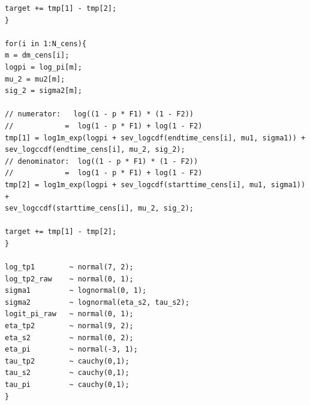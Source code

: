 \documentclass[12pt]{article}
\begin{document}
{\begin{verbatim}
target += tmp[1] - tmp[2];
}

for(i in 1:N_cens){
m = dm_cens[i];
logpi = log_pi[m];
mu_2 = mu2[m];
sig_2 = sigma2[m];

// numerator:   log((1 - p * F1) * (1 - F2))
//            =  log(1 - p * F1) + log(1 - F2)
tmp[1] = log1m_exp(logpi + sev_logcdf(endtime_cens[i], mu1, sigma1)) +
sev_logccdf(endtime_cens[i], mu_2, sig_2);
// denominator:  log((1 - p * F1) * (1 - F2))
//            =  log(1 - p * F1) + log(1 - F2)
tmp[2] = log1m_exp(logpi + sev_logcdf(starttime_cens[i], mu1, sigma1)) +
sev_logccdf(starttime_cens[i], mu_2, sig_2);

target += tmp[1] - tmp[2];
}

log_tp1        ~ normal(7, 2);
log_tp2_raw    ~ normal(0, 1);
sigma1         ~ lognormal(0, 1);
sigma2         ~ lognormal(eta_s2, tau_s2);
logit_pi_raw   ~ normal(0, 1);
eta_tp2        ~ normal(9, 2);
eta_s2         ~ normal(0, 2);
eta_pi         ~ normal(-3, 1);
tau_tp2        ~ cauchy(0,1);
tau_s2         ~ cauchy(0,1);
tau_pi         ~ cauchy(0,1);
}

\end{verbatim}
}

\pagebreak
\end{document}
